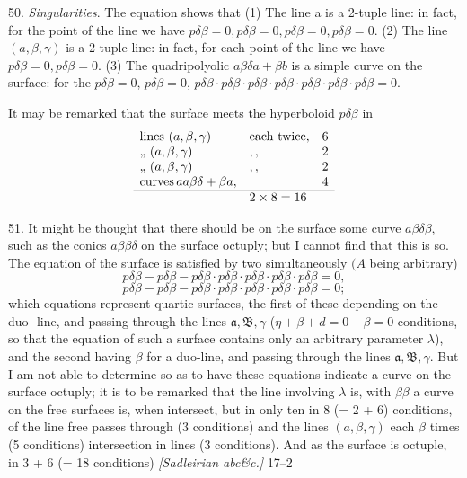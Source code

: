 \documentclass[11pt,a4paper]{book}
\begin{document}
50. \textit{Singularities}. The equation shows that
\quad(1) The line a is a 2-tuple line: in fact, for the point of the line we have
$p\delta\beta = 0, p\delta\beta = 0, p\delta\beta = 0, p\delta\beta = 0$.
\quad(2) The line $(a, \beta, \gamma)$ is a 2-tuple line: in fact, for each point of the line
we have $p\delta\beta = 0, p\delta\beta = 0$.
\quad(3) The quadripolyolic $a\beta\delta a + \beta b$ is a simple curve on the surface: for the
$p\delta\beta = 0$, $p\delta\beta = 0$, $p\delta\beta\cdot p\delta\beta\cdot p\delta\beta\cdot p\delta\beta\cdot p\delta\beta\cdot p\delta\beta\cdot p\delta\beta = 0$.

It may be remarked that the surface meets the hyperboloid $p\delta\beta$ in
\[
\begin{array}{lll}
\text{lines}\ (a, \beta, \gamma) & \text{each twice,} & 6 \\
\text{,, } (a, \beta, \gamma) & ,, & 2 \\
\text{,, } (a, \beta, \gamma) & ,, & 2 \\
\text{curves}\,a a \beta\delta + \beta a, &  & 4 \\
\hline
& 2 \times 8 = 16
\end{array}
\]

51. It might be thought that there should be on the surface some curve $a\beta\delta\beta$,
such as the conics $a\beta\beta\delta$ on the surface octuply; but I cannot find that this is so.
The equation of the surface is satisfied by two simultaneously $(A$ being arbitrary)
\[
p\delta\beta - p\delta\beta - p\delta\beta\cdot p\delta\beta\cdot p\delta\beta\cdot p\delta\beta\cdot p\delta\beta = 0,
\]
\[
p\delta\beta - p\delta\beta - p\delta\beta\cdot p\delta\beta\cdot p\delta\beta\cdot p\delta\beta\cdot p\delta\beta = 0;
\]
which equations represent quartic surfaces, the first of these depending on the duo-
line, and passing through the lines $\mathfrak{a}, \mathfrak{B}, \gamma$ ($\eta + \beta + d = 0$ -- $\beta = 0$ conditions, so that the
equation of such a surface contains only an arbitrary parameter $\lambda$), and the second
having $\beta$ for a duo-line, and passing through the lines $\mathfrak{a}, \mathfrak{B}, \gamma$. But I am not
able to determine so as to have these equations indicate a curve on the surface
octuply; it is to be remarked that the line involving $\lambda$ is, with $\beta\beta$ a curve on the
free surfaces is, when intersect, but in only ten in 8 (= 2 + 6) conditions, of the line
free passes through (3 conditions) and the lines $(a, \beta, \gamma)$ each $\beta$ times (5 conditions)
intersection in lines (3 conditions). And as the surface is octuple, in 3 + 6 (= 18 conditions)
\textit{[Sadleirian abc\&c.]} \hfill 17--2
\end{document}
